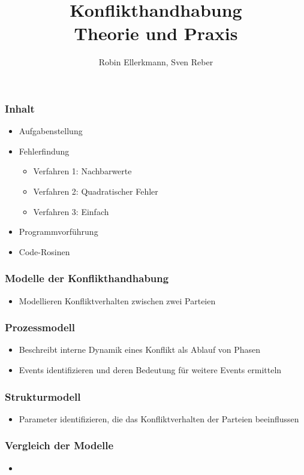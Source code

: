 \documentclass[12pt,a4paper]{beamer}
\author{Robin Ellerkmann, Sven Reber}
\title{Konflikthandhabung\\Theorie und Praxis}
\begin{document}
\maketitle

\begin{frame}
	\frametitle{Inhalt}
	
	\begin{itemize}
		\item Aufgabenstellung
		\item Fehlerfindung
		\begin{itemize}
			\item Verfahren 1: Nachbarwerte
			\item Verfahren 2: Quadratischer Fehler
			\item Verfahren 3: Einfach
		\end{itemize}
		\item Programmvorf\"uhrung
		\item Code-Rosinen
	\end{itemize}
\end{frame}

\begin{frame}
	\frametitle{Modelle der Konflikthandhabung}
	\begin{itemize}
		\item Modellieren Konfliktverhalten zwischen zwei Parteien
	\end{itemize}
\end{frame}

\begin{frame}
	\frametitle{Prozessmodell}
	\begin{itemize}
		\item Beschreibt interne Dynamik eines Konflikt als Ablauf von Phasen
		\item Events identifizieren und deren Bedeutung für weitere Events ermitteln
	\end{itemize}
\end{frame}


\begin{frame}
	\frametitle{Strukturmodell}
	\begin{itemize}
		\item Parameter identifizieren, die das Konfliktverhalten der Parteien beeinflussen 
	\end{itemize}
\end{frame}


\begin{frame}
	\frametitle{Vergleich der Modelle}
	\begin{itemize}
		\item 
	\end{itemize}
\end{frame}
\end{document}
